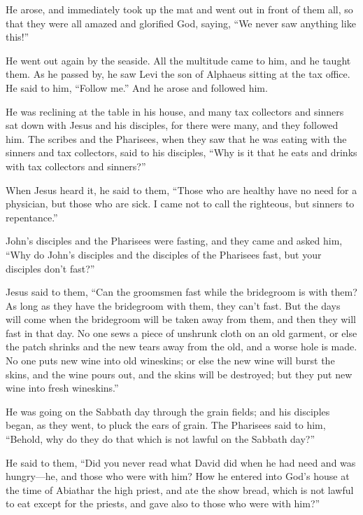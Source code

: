  He arose, and immediately took up the mat and went out in
front of them all, so that they were all amazed and glorified God,
saying, ``We never saw anything like this!''

 He went out again by the seaside. All the multitude came
to him, and he taught them.  As he passed by, he saw Levi
the son of Alphaeus sitting at the tax office. He said to him, ``Follow
me.'' And he arose and followed him.

 He was reclining at the table in his house, and many tax
collectors and sinners sat down with Jesus and his disciples, for there
were many, and they followed him.  The scribes and the
Pharisees, when they saw that he was eating with the sinners and tax
collectors, said to his disciples, ``Why is it that he eats and drinks
with tax collectors and sinners?''

 When Jesus heard it, he said to them, ``Those who are
healthy have no need for a physician, but those who are sick. I came not
to call the righteous, but sinners to repentance.''

 John's disciples and the Pharisees were fasting, and they
came and asked him, ``Why do John's disciples and the disciples of the
Pharisees fast, but your disciples don't fast?''

 Jesus said to them, ``Can the groomsmen fast while the
bridegroom is with them? As long as they have the bridegroom with them,
they can't fast.  But the days will come when the
bridegroom will be taken away from them, and then they will fast in that
day.  No one sews a piece of unshrunk cloth on an old
garment, or else the patch shrinks and the new tears away from the old,
and a worse hole is made.  No one puts new wine into old
wineskins; or else the new wine will burst the skins, and the wine pours
out, and the skins will be destroyed; but they put new wine into fresh
wineskins.''

 He was going on the Sabbath day through the grain fields;
and his disciples began, as they went, to pluck the ears of grain.
 The Pharisees said to him, ``Behold, why do they do that
which is not lawful on the Sabbath day?''

 He said to them, ``Did you never read what David did when
he had need and was hungry---he, and those who were with him?
 How he entered into God's house at the time of Abiathar
the high priest, and ate the show bread, which is not lawful to eat
except for the priests, and gave also to those who were with him?''

